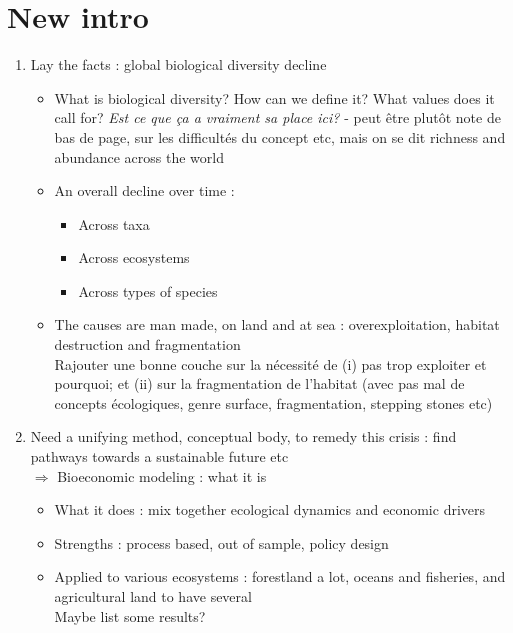\section{New intro}

\begin{enumerate}
\item Lay the facts : global biological diversity decline
\begin{itemize}
\item What is biological diversity? How can we define it? What values does it call for? \textit{Est ce que ça a vraiment sa place ici?} - peut être plutôt note de bas de page, sur les difficultés du concept etc, mais on se dit richness and abundance across the world
\item An overall decline over time : 
\begin{itemize}
\item Across taxa
\item Across ecosystems
\item Across types of species
\end{itemize}

\item The causes are man made, on land and at sea : overexploitation, habitat destruction and fragmentation
\\
Rajouter une bonne couche sur la nécessité de (i) pas trop exploiter et pourquoi; et (ii) sur la fragmentation de l'habitat (avec pas mal de concepts écologiques, genre surface, fragmentation, stepping stones etc)
\end{itemize}

\item Need a unifying method, conceptual body, to remedy this crisis : find pathways towards a sustainable future etc\\
$\Rightarrow$ Bioeconomic modeling : what it is

\begin{itemize}
\item What it does : mix together ecological dynamics and economic drivers
\item Strengths : process based, out of sample, policy design
\item Applied to various ecosystems : forestland a lot, oceans and fisheries, and agricultural land to have several \\
Maybe list some results?
\end{itemize}


\end{enumerate}

